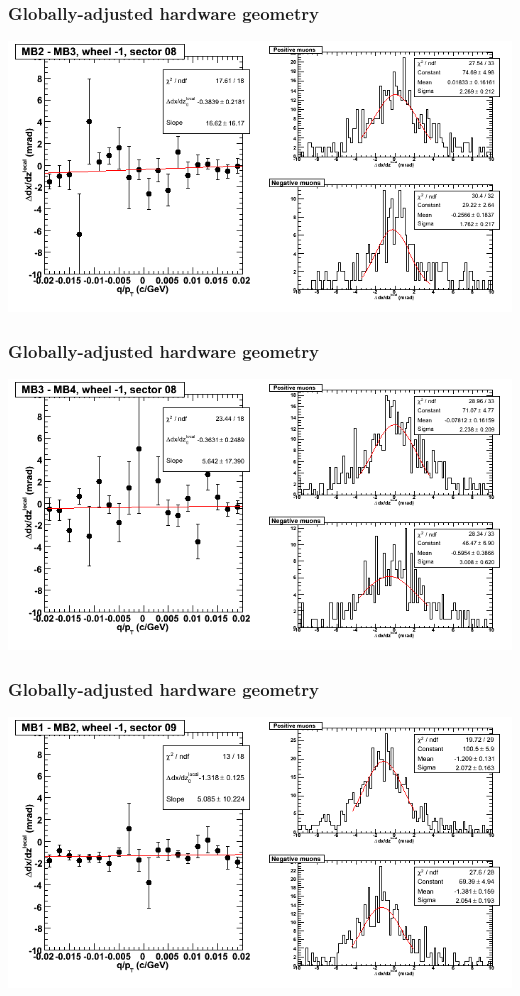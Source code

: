 \documentclass[compress]{beamer}
\begin{document}
\begin{frame}
\frametitle{Globally-adjusted hardware geometry}
\includegraphics[width=\linewidth]{NOV4_segdiffs_HW/dt13_slope_B_08_23.png}
\end{frame}

\begin{frame}
\frametitle{Globally-adjusted hardware geometry}
\includegraphics[width=\linewidth]{NOV4_segdiffs_HW/dt13_slope_B_08_34.png}
\end{frame}

\begin{frame}
\frametitle{Globally-adjusted hardware geometry}
\includegraphics[width=\linewidth]{NOV4_segdiffs_HW/dt13_slope_B_09_12.png}
\end{frame}
\end{document}
